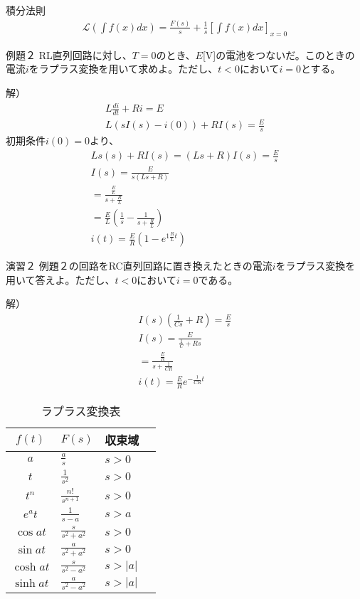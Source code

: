 \documentclass{jsarticle}
\begin{document}
\begin{itembox}[l]{積分法則}
\begin{eqnarray}
\mathcal{L}\left(\int f(x)dx\right)=\frac{F(s)}{s}+\frac{1}{s}\left[\int f(x)dx\right]_{x=0}
\end{eqnarray}
\end{itembox}
\begin{itembox}[l]{例題２}
RL直列回路に対し、$T=0$のとき、$E$[V]の電池をつないだ。このときの電流$i$をラプラス変換を用いて求めよ。ただし、$t<0$において$i=0$とする。
\end{itembox}
解）
\begin{eqnarray}
L\frac{di}{dt}+Ri=E\\
L(sI(s)-i(0))+RI(s)=\frac{E}{s}
\end{eqnarray}
初期条件$i(0)=0$より、
\begin{eqnarray}
Ls(s)+RI(s)=(Ls+R)I(s)=\frac{E}{s}\\
I(s)=\frac{E}{s(Ls+R)}\\
=\frac{\frac{E}{L}}{s+\frac{R}{L}}\\
=\frac{E}{L}\left(\frac{1}{s}-\frac{1}{s+\frac{R}{L}}\right)\\
i(t)=\frac{E}{R}\left(1-e^{1\frac{R}{L}t}\right)
\end{eqnarray}
\begin{itembox}[l]{演習２}
例題２の回路をRC直列回路に置き換えたときの電流$i$をラプラス変換を用いて答えよ。ただし、$t<0$において$i=0$である。
\end{itembox}
解）
\begin{eqnarray}
I(s)\left(\frac{1}{Cs}+R\right)=\frac{E}{s}\\
I(s)=\frac{E}{\frac{1}{C}+Rs}\\
=\frac{\frac{E}{R}}{s+\frac{1}{CR}}\\
i(t)=\frac{E}{R}e^{-\frac{1}{CR}t}
\end{eqnarray}
\clearpage
\begin{table}[h]
 \caption{ラプラス変換表} 
 \label{table:SpeedOfLight}
 \centering
  \begin{tabular}{clll}
   \hline
   $f(t)$ & $F(s)$ &収束域\\
   \hline \hline
   $a$ & $\frac{a}{s}$  & $s>0$\\
   $t$ & $\frac{1}{s^2}$ & $s>0$\\
   $t^n$ & $\frac{n!}{s^{n+1}}$ &  $s>0$ \\
   $e^at$ & $\frac{1}{s-a}$ & $s>a$ \\
   $\cos at$ & $\frac{s}{s^2+a^2}$ & $s>0$ \\
   $\sin at$ & $\frac{a}{s^2+a^2}$ & $s>0$ \\
   $\cosh at$ & $\frac{s}{s^2-a^2}$ & $s>|a|$ \\
   $\sinh at$ & $\frac{a}{s^2-a^2}$ & $s>|a|$ \\
   \hline
  \end{tabular}
\end{table}
\end{document}
